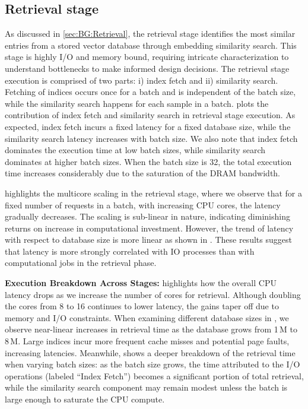 \subsection{Retrieval stage}
\label{sec:char:Retrieval}
As discussed in \ref{sec:BG:Retrieval}, the retrieval stage identifies the \topk most similar entries from a stored vector database through embedding similarity search. This stage is highly I/O and memory bound, requiring intricate characterization to understand bottlenecks to make informed design decisions. 
The retrieval stage execution is comprised of two parts: i) index fetch and ii) similarity search. Fetching of indices occurs once for a batch and is independent of the batch size, while the similarity search happens for each sample in a batch.  plots the contribution of index fetch and similarity search in retrieval stage execution. As expected, index fetch incurs a fixed latency for a fixed database size, while the similarity search latency increases with batch size. We also note that index fetch dominates the execution time at low batch sizes, while similarity search dominates at higher batch sizes. When the batch size is 32, the total execution time increases considerably due to the saturation of the DRAM bandwidth.

 highlights the multicore scaling in the retrieval stage, where we observe that for a fixed number of requests in a batch, with increasing CPU cores, the latency gradually decreases. The scaling is sub-linear in nature, indicating diminishing returns on increase in computational investment. However, the trend of latency with respect to database size is more linear as shown in . These results suggest that latency is more strongly correlated with IO processes than with computational jobs in the retrieval phase. 

\noindent\textbf{Execution Breakdown Across Stages: }
 highlights how the overall CPU latency drops as we increase the number of cores for retrieval. Although doubling the cores from 8 to 16 continues to lower latency, the gains taper off due to memory and I/O constraints. 
When examining different database sizes in , we observe near-linear increases in retrieval time as the database grows from 1\,M to 8\,M. Large indices incur more frequent cache misses and potential page faults, increasing latencies. 
Meanwhile,  shows a deeper breakdown of the retrieval time when varying batch sizes: as the batch size grows, the time attributed to the I/O operations (labeled ``Index Fetch'') becomes a significant portion of total retrieval, while the similarity search component may remain modest unless the batch is large enough to saturate the CPU compute.

